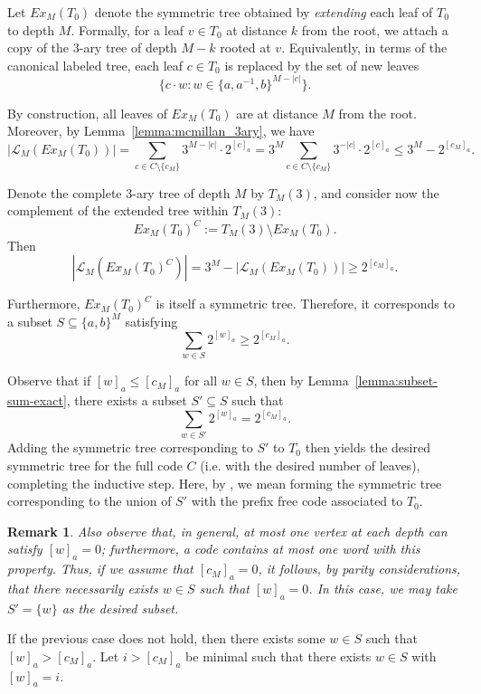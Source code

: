 \documentclass[a4,12pt]{article}%
\newtheorem{remark}[theorem]{Remark}
\begin{document}
Let $Ex_M(T_0)$ denote the symmetric tree obtained by \emph{extending} each leaf of $T_0$ to depth $M$. Formally, for a leaf $v \in T_0$ at distance $k$ from the root, we attach a copy of the 3-ary tree of depth $M-k$ rooted at $v$. Equivalently, in terms of the canonical labeled tree, each leaf $c \in T_0$ is replaced by the set of new leaves
\[
\{ c \cdot w : w \in \{a, a^{-1}, b\}^{M - \lvert c\rvert} \}.
\]

By construction, all leaves of $Ex_M(T_0)$ are at distance $M$ from the root. Moreover, by Lemma~\ref{lemma:mcmillan_3ary}, we have
\[
|\mathcal{L}_M(Ex_M(T_0))| 
= \sum_{c \in C \setminus \{c_M\}} 3^{M-\lvert c\rvert} \cdot 2^{[c]_a} 
= 3^M \sum_{c \in C \setminus \{c_M\}} 3^{-\lvert c\rvert} \cdot 2^{[c]_a} 
\le 3^M - 2^{[c_M]_a}.
\]

Denote the complete 3-ary tree of depth $M$ by $T_M(3)$, and consider now the complement of the extended tree within $T_M(3)$:
\[
Ex_M(T_0)^C := T_M(3) \setminus Ex_M(T_0).
\]
Then
\[
|\mathcal{L}_M(Ex_M(T_0)^C)| = 3^M - |\mathcal{L}_M(Ex_M(T_0))| \ge 2^{[c_M]_a}.
\]

Furthermore, $Ex_M(T_0)^C$ is itself a symmetric tree. Therefore, it corresponds to a subset $S \subseteq \{a, b\}^M$ satisfying
\[
\sum_{w \in S} 2^{[w]_a} \ge 2^{[c_M]_a}.
\]

\medskip 
Observe that if $[w]_a \le [c_M]_a$ for all $w \in S$, then by Lemma~\ref{lemma:subset-sum-exact}, there exists a subset $S' \subseteq S$ such that
\[
\sum_{w \in S'} 2^{[w]_a} = 2^{[c_M]_a}.
\]
Adding the symmetric tree corresponding to $S'$ to $T_0$ then yields the desired symmetric tree for the full code $C$ (i.e. with the desired number of leaves), completing the inductive step. Here, by , we mean forming the symmetric tree corresponding to the union of $S'$ with the prefix free code associated to $T_0$.

\begin{remark}\label{remark: only b case}
    Also observe that, in general, at most one vertex at each depth can satisfy $[w]_a = 0$; furthermore, a code contains at most one word with this property. Thus, if we assume that $[c_M]_a = 0$, it follows, by parity considerations, that there necessarily exists $w \in S$ such that $[w]_a = 0$. In this case, we may take $S' = \{w\}$ as the desired subset.
\end{remark}

If the previous case does not hold, then there exists some $w \in S$ such that $[w]_a > [c_M]_a$. Let $i > [c_M]_a$ be minimal such that there exists $w \in S$ with $[w]_a = i$.
\end{document}
